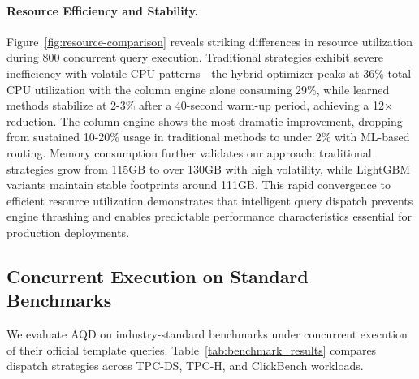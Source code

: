 \documentclass[sigconf, nonacm]{acmart}
\newcommand{\dispatcher}{AQD\xspace}
\begin{document}
\paragraph{Resource Efficiency and Stability.}
Figure~\ref{fig:resource-comparison} reveals striking differences in resource utilization during 800 concurrent query execution. Traditional strategies exhibit severe inefficiency with volatile CPU patterns—the hybrid optimizer peaks at 36\% total CPU utilization with the column engine alone consuming 29\%, while learned methods stabilize at 2-3\% after a 40-second warm-up period, achieving a 12× reduction. The column engine shows the most dramatic improvement, dropping from sustained 10-20\% usage in traditional methods to under 2\% with ML-based routing. Memory consumption further validates our approach: traditional strategies grow from 115GB to over 130GB with high volatility, while LightGBM variants maintain stable footprints around 111GB. This rapid convergence to efficient resource utilization demonstrates that intelligent query dispatch prevents engine thrashing and enables predictable performance characteristics essential for production deployments.



\subsection{Concurrent Execution on Standard Benchmarks}

We evaluate \dispatcher on industry-standard benchmarks under concurrent execution of their official template queries. Table~\ref{tab:benchmark_results} compares dispatch strategies across TPC-DS, TPC-H, and ClickBench workloads.
\end{document}
